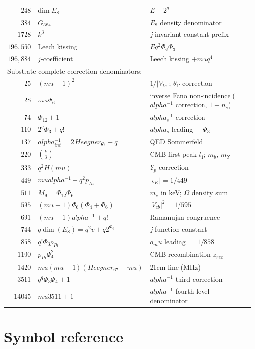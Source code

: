 \documentclass[11pt]{article}
\def\mathrm#1{#1}%
\def\textbf#1{#1}%
\def\text#1{#1}%
\def\alpha{alpha}%
\def\mu{mu}%
\def\Phi#1{Phi#1}%
\def\cdot{ }%
\begin{document}
{\begin{longtable}{r l l}
$248$ & dim $E_8$ & $E + 2^q$ \\
$384$ & $G_{384}$ & $E_8$ density denominator \\
$1728$ & $k^3$ & $j$-invariant constant prefix \\
$196{,}560$ & Leech kissing & $E \cdot q^2 \cdot \Phi_6 \cdot \Phi_3$ \\
$196{,}884$ & $j$-coefficient & Leech kissing $+ \mu \cdot q^4$ \\
\midrule
\multicolumn{3}{l}{\textbf{Substrate-complete correction denominators:}} \\
$25$ & $(\mu+1)^2$ & $1/|V_{ts}|$; $\theta_C$ correction \\
$28$ & $\mu \Phi_6$ & inverse Fano non-incidence ($\alpha^{-1}$ correction, $1-n_s$) \\
$74$ & $\Phi_{12}+1$ & $\alpha_s^{-1}$ correction \\
$110$ & $2^q\Phi_3 + q!$ & $\alpha_s$ leading + $\Phi_3$ \\
$137$ & $\alpha^{-1}_{\text{int}} = 2\,\mathrm{Heegner}_{67}+q$ & QED Sommerfeld \\
$220$ & $\binom{k}{3}$ & CMB first peak $l_1$; $m_b$, $m_{\Upsilon}$ \\
$333$ & $q^2 H(\mu)$ & $Y_p$ correction \\
$449$ & $\mu\alpha^{-1}-q^2 p_{\mathrm{Ih}}$ & $|\epsilon_K| = 1/449$ \\
$511$ & $M_9 = \Phi_{12}\Phi_6$ & $m_e$ in keV; $\Omega$ density sum \\
$595$ & $(\mu+1)\Phi_6(\Phi_4+\Phi_6)$ & $|V_{cb}|^2 = 1/595$ \\
$691$ & $(\mu+1)\alpha^{-1}+q!$ & Ramanujan congruence \\
$744$ & $q\cdot\dim(E_8)=q^2 v + q\cdot 2^{\Phi_6}$ & $j$-function constant \\
$858$ & $q!\Phi_3 p_{\mathrm{Ih}}$ & $a_\mu$ leading $= 1/858$ \\
$1100$ & $p_{\mathrm{Ih}}\Phi_4^2$ & CMB recombination $z_{\text{rec}}$ \\
$1420$ & $\mu(\mu+1)(\mathrm{Heegner}_{67}+\mu)$ & 21cm line (MHz) \\
$3511$ & $q^q\Phi_3\Phi_4+1$ & $\alpha^{-1}$ third correction \\
$14045$ & $\mu\cdot 3511 + 1$ & $\alpha^{-1}$ fourth-level denominator \\
\end{longtable}
}

\section{Symbol reference}
\end{document}
